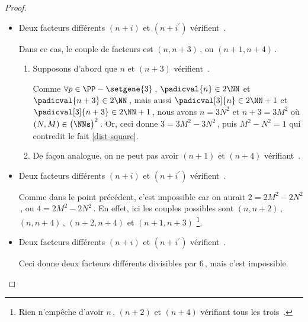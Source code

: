 \begin{proof}
\begin{itemize}
    	\item Deux facteurs différents $(n+i)$ et $(n+i^\prime)$ vérifient \,.
		
		\smallskip
		\noindent
		Dans ce cas, le couple de facteurs est $(n, n + 3)$\,, ou $(n + 1, n + 4)$\,.    
		\begin{enumerate}
			\item Supposons d'abord que $n$ et $(n+3)$ vérifient \,.
			
			\noindent
			Comme $\forall p \in \PP - \setgene{3}$\,, $\padicval{n} \in 2 \NN$ et $\padicval{n + 3} \in 2 \NN$\,,
			mais aussi $\padicval[3]{n} \in 2 \NN + 1$ et $\padicval[3]{n + 3} \in 2 \NN + 1$\,,
			nous avons $n = 3 N^2$ et $n+3 = 3 M^2$ où $(N, M) \in \big( \NNs \big)^2$\,.
			Or, ceci donne $3 = 3 M^2 - 3 N^2$\,, puis $M^2 - N^2 = 1$ qui contredit le fait \ref{dist-square}.

			\item De façon analogue, on ne peut pas avoir $(n+1)$ et $(n+4)$ vérifiant \,.
		\end{enumerate}


    	\item Deux facteurs différents $(n+i)$ et $(n+i^\prime)$ vérifient \,.
		
		\smallskip
		\noindent
		Comme dans le point précédent, c'est impossible car on aurait $2 = 2 M^2 - 2 N^2$\,, ou $4 = 2 M^2 - 2 N^2$\,. 
		En effet, ici les couples possibles sont $(n, n + 2)$\,, $(n, n + 4)$\,,  $(n + 2, n + 4)$ et $(n + 1, n + 3)$
		\footnote{
			Rien n'empêche d'avoir $n$\,, $(n + 2)$ et $(n + 4)$ vérifiant tous les trois \,.
		}.


    	\item Deux facteurs différents $(n+i)$ et $(n+i^\prime)$ vérifient \,.
		
		\smallskip
		\noindent
		Ceci donne deux facteurs différents divisibles par $6$\,, mais c'est impossible. \qedhere
    \end{itemize}
\end{proof}




